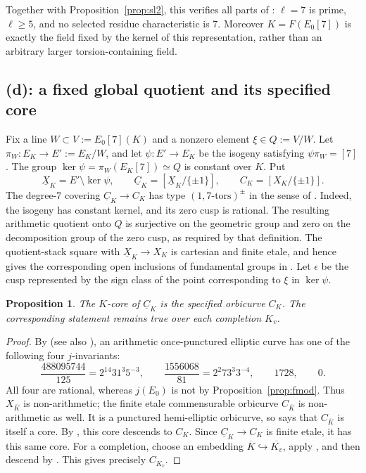 \documentclass[11pt]{article}
\theoremstyle{plain}
\newtheorem{proposition}[theorem]{Proposition}
\theoremstyle{definition}
\begin{document}
Together with Proposition~\ref{prop:sl2}, this verifies all parts of
\cite[Definition 3.1(c)]{IUT1}: $\ell=7$ is prime, $\ell\ge5$, and no
selected residue characteristic is $7$.
Moreover $K=F(E_0[7])$ is exactly the field fixed by the kernel of this
representation, rather than an arbitrary larger torsion-containing field.

\subsection{(d): a fixed global quotient and its specified core}
\label{sec:kcore}

Fix a line $W\subset V:=E_0[7](K)$ and a nonzero element $\xi\in Q:=V/W$.
Let $\pi_W:E_K\to E':=E_K/W$, and let $\psi:E'\to E_K$ be the isogeny
satisfying $\psi\pi_W=[7]$. The group
$\ker\psi=\pi_W(E_K[7])\simeq Q$ is constant over $K$.
Put
\[
 \underline X_K=E'\setminus\ker\psi,\qquad
 \underline C_K=[\underline X_K/\{\pm1\}],\qquad
 C_K=[X_K/\{\pm1\}].
\]
The degree-$7$ covering $\underline C_K\to C_K$ has type
$(1,7\text{-tors})^{\pm}$ in the sense of
\cite[Definition 2.1]{EtTh}.
Indeed, the isogeny has constant kernel, and its zero cusp is rational.
The resulting arithmetic quotient onto $Q$ is surjective on the geometric
group and zero on the decomposition group of the zero cusp, as required
by that definition. The quotient-stack square with
$\underline X_K\to X_K$ is cartesian and finite etale, and hence gives the
corresponding open inclusions of fundamental groups in
\cite[Definition 3.1(d)]{IUT1}.
Let $\epsilon$ be the cusp represented by the sign class of the point
corresponding to $\xi$ in $\ker\psi$.

\begin{proposition}\label{prop:kcore}
The $K$-core of $\underline C_K$ is the specified orbicurve $C_K$.
The corresponding statement remains true over each completion $K_v$.
\end{proposition}

\begin{proof}
By \cite[Proposition 2.1]{MFHMP} (see also \cite[Table 4]{Sijs}), an arithmetic once-punctured elliptic
curve has one of the following four $j$-invariants:
\[
 \frac{488095744}{125}=2^{14}31^3 5^{-3},\qquad
 \frac{1556068}{81}=2^2 73^3 3^{-4},\qquad 1728,\qquad0.
\]
All four are rational, whereas $j(E_0)$ is not by
Proposition~\ref{prop:fmod}.
Thus $X_{\overline K}$ is non-arithmetic; the finite etale commensurable
orbicurve $C_{\overline K}$ is non-arithmetic as well.
It is a punctured hemi-elliptic orbicurve, so
\cite[Proposition 2.7]{CanLift} says that $C_{\overline K}$ is itself a core.
By \cite[Proposition 2.3(i)]{CanLift}, this core descends to $C_K$.
Since $\underline C_K\to C_K$ is finite etale, it has this same core.
For a completion, choose an embedding
$\overline K\hookrightarrow\overline{K_v}$, apply
\cite[Proposition 2.3(ii)]{CanLift}, and then descend by
\cite[Proposition 2.3(i)]{CanLift}. This gives precisely $C_{K_v}$.
\end{proof}
\end{document}

